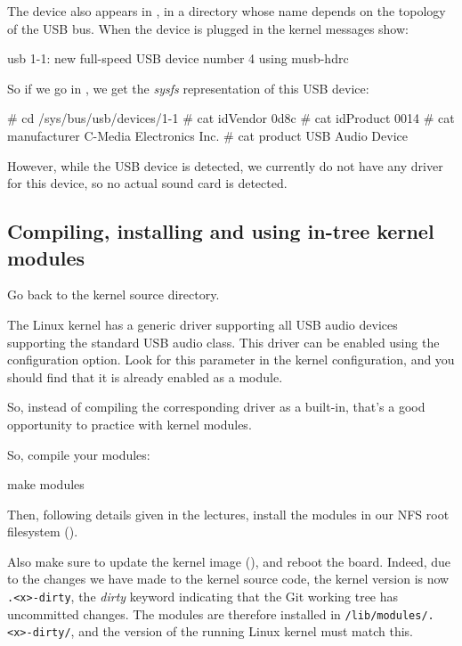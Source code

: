 {The device also appears in , in a
directory whose name depends on the topology of the USB bus. When the
device is plugged in the kernel messages show:

\begin{bashinput}
usb 1-1: new full-speed USB device number 4 using musb-hdrc
\end{bashinput}

So if we go in , we get the {\em
sysfs} representation of this USB device:

\begin{bashinput}
# cd /sys/bus/usb/devices/1-1
# cat idVendor
0d8c
# cat idProduct
0014
# cat manufacturer
C-Media Electronics Inc.
# cat product
USB Audio Device
\end{bashinput}

However, while the USB device is detected, we currently do not have
any driver for this device, so no actual sound card is detected.

\subsection{Compiling, installing and using in-tree kernel modules}

Go back to the kernel source directory.

The Linux kernel has a generic driver supporting all USB audio devices
supporting the standard USB audio class. This driver can be enabled
using the  configuration option. Look
for this parameter in the kernel configuration, and you should find
that it is already enabled as a module.

So, instead of compiling the corresponding driver as a built-in, that's
a good opportunity to practice with kernel modules.

So, compile your modules:
\begin{bashinput}
make modules
\end{bashinput}

Then, following details given in the lectures, install the modules in our NFS
root filesystem ().

Also make sure to update the kernel image (), and reboot the
board.  Indeed, due to the changes we have made to the kernel source code,
the kernel version is now {\tt \workingkernel.<x>-dirty}, the {\em dirty}
keyword indicating that the Git working tree has uncommitted changes.
The modules are therefore installed in {\tt /lib/modules/\workingkernel.<x>-dirty/},
and the version of the running Linux kernel must match this.

}
